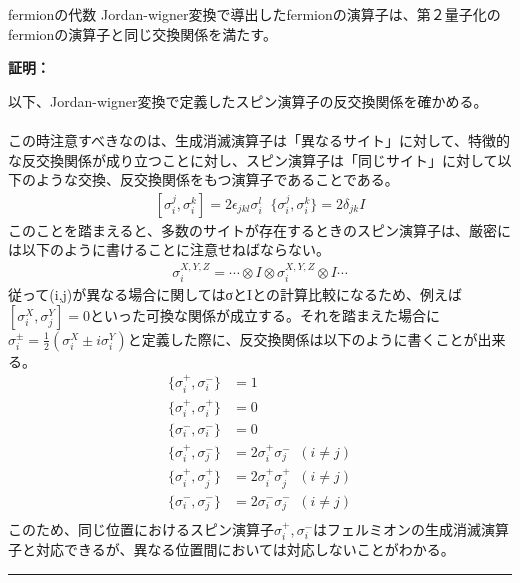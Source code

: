 \documentclass[a4paper,10.5pt]{article}
\numberwithin{equation}{section}
\newenvironment{proofbox}
{\begin{prooflabel}\textbf{証明：}\end{prooflabel}\vspace{0.8em}}
{\par\vspace{1em}\hrule\vspace{1em}}
\begin{document}
\begin{resultbox}{fermionの代数}
    Jordan-wigner変換で導出したfermionの演算子は、第２量子化のfermionの演算子と同じ交換関係を満たす。
\end{resultbox}
\begin{proofbox}
以下、Jordan-wigner変換で定義したスピン演算子の反交換関係を確かめる。\\
\\
この時注意すべきなのは、生成消滅演算子は「異なるサイト」に対して、特徴的な反交換関係が成り立つことに対し、スピン演算子は「同じサイト」に対して以下のような交換、反交換関係をもつ演算子であることである。
\begin{equation}\begin{split}
   [\sigma_{i}^{j},\sigma_{i}^{k}] = 2\epsilon_{jkl} \sigma_{i}^{l}
   \;\;
   \{ \sigma_{i}^{j},\sigma_{i}^{k} \} = 2\delta_{jk} I
\end{split} \end{equation} 
このことを踏まえると、多数のサイトが存在するときのスピン演算子は、厳密には以下のように書けることに注意せねばならない。
 \begin{equation}\begin{split}
     \sigma_{i}^{X,Y,Z} = \cdots \otimes I \otimes \sigma_{i}^{X,Y,Z} \otimes I\cdots
     \label{genmitu}
 \end{split} \end{equation}
従って(i,j)が異なる場合に関してはσとIとの計算比較になるため、例えば$[\sigma_{i}^{X},\sigma_{j}^{Y}]=0$といった可換な関係が成立する。それを踏まえた場合に$\sigma_{i}^{\pm}=\frac{1}{2}(\sigma_{i}^{X} \pm i \sigma_{i}^{Y})$と定義した際に、反交換関係は以下のように書くことが出来る。
\begin{equation}\begin{split}
    \{\sigma_{i}^{+},\sigma_{i}^{-}\}&=1\\
    \{\sigma_{i}^{+},\sigma_{i}^{+}\}&=0\\
    \{\sigma_{i}^{-},\sigma_{i}^{-}\}&=0\\
    \{\sigma_{i}^{+},\sigma_{j}^{-}\}&=2\sigma_{i}^{+}\sigma_{j}^{-}\;\;(i\neq j)\\
    \{\sigma_{i}^{+},\sigma_{j}^{+}\}&=2\sigma_{i}^{+}\sigma_{j}^{+}\;\;(i\neq j)\\
    \{\sigma_{i}^{-},\sigma_{j}^{-}\}&=2\sigma_{i}^{-}\sigma_{j}^{-}\;\;(i\neq j)\\
\end{split} \end{equation}
このため、同じ位置におけるスピン演算子$\sigma_{i}^{+},\sigma_{i}^{-}$はフェルミオンの生成消滅演算子と対応できるが、異なる位置間においては対応しないことがわかる。\\

\end{proofbox}
\end{document}
